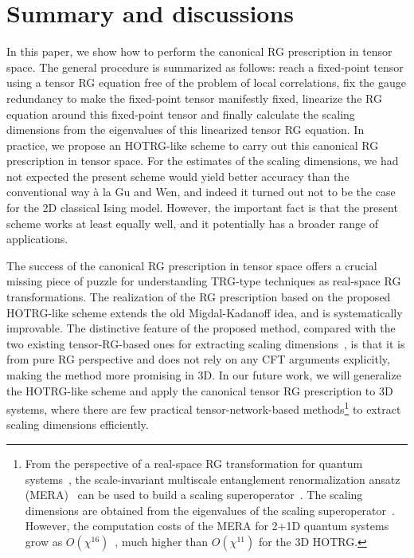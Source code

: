 \documentclass[aps,prr,reprint,superscriptaddress,nofootinbib,floatfix]{revtex4-2}
\begin{document}
\section{Summary and discussions\label{conclusion}}
In this paper, we show how to perform the canonical RG prescription in tensor space.
The general procedure is summarized as follows: reach a fixed-point tensor using a tensor RG equation free of the problem of local correlations, fix the gauge redundancy to make the fixed-point tensor manifestly fixed, linearize the RG equation around this fixed-point tensor and finally calculate the scaling dimensions from the eigenvalues of this linearized tensor RG equation.
In practice, we propose an HOTRG-like scheme to carry out this canonical RG prescription in tensor space.
For the estimates of the scaling dimensions, we had not expected the present scheme would yield better accuracy than the conventional way \`a la Gu and Wen, and indeed it turned out not to be the case for the 2D classical Ising model.
However, the important fact is that the present scheme works at least equally well, and it potentially has a broader range of applications.
%

The success of the canonical RG prescription in tensor space offers a crucial missing piece of puzzle for understanding TRG-type techniques as real-space RG transformations.
The realization of the RG prescription based on the proposed HOTRG-like scheme extends the old Migdal-Kadanoff idea, and is systematically improvable.
The distinctive feature of the proposed method, compared with the two existing tensor-RG-based ones for extracting scaling dimensions~\cite{GuWen2009,EvenblyDilatationOp}, is that it is from pure RG perspective and does not rely on any CFT arguments explicitly, making the method more promising in 3D.
In our future work, we will generalize the HOTRG-like scheme and apply the canonical tensor RG prescription to 3D systems, where there are few practical tensor-network-based methods\footnote{
    From the perspective of a real-space RG transformation for quantum systems~\cite{ER2007}, the scale-invariant multiscale entanglement renormalization ansatz (MERA)~\cite{MERA} can be used to build a scaling superoperator~\cite{MERAsupop}. 
    The scaling dimensions are obtained from the eigenvalues of the scaling superoperator~\cite{supop2scaleD}. 
However, the computation costs of the MERA for 2+1D quantum systems grow as $O(\chi^{16})$~\cite{MERA2p1}, much higher than $O(\chi^{11})$ for the 3D HOTRG\@.
} 
to extract scaling dimensions efficiently. 
\end{document}
